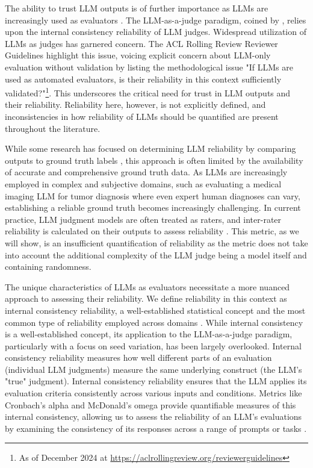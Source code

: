\documentclass[11pt]{article}
\begin{document}
The ability to trust LLM outputs is of further importance as LLMs are increasingly used as evaluators \citep{desmond2024evalullm, chan2023chateval}. The LLM-as-a-judge paradigm, coined by \citet{zheng2023judging}, relies upon the internal consistency reliability of LLM judges. Widespread utilization of LLMs as judges has garnered concern. The ACL Rolling Review Reviewer Guidelines highlight this issue, voicing explicit concern about LLM-only evaluation without validation by listing the methodological issue "If LLMs are used as automated evaluators, is their reliability in this context sufficiently validated?"\footnote{As of December 2024 at \url{https://aclrollingreview.org/reviewerguidelines}}. This underscores the critical need for trust in LLM outputs and their reliability. Reliability here, however, is not explicitly defined, and inconsistencies in how reliability of LLMs should be quantified are present throughout the literature.

While some research has focused on determining LLM reliability by comparing outputs to ground truth labels \citep{zhou2024llm, fu2023large}, this approach is often limited by the availability of accurate and comprehensive ground truth data. As LLMs are increasingly employed in complex and subjective domains, such as evaluating a medical imaging LLM for tumor diagnosis where even expert human diagnoses can vary, establishing a reliable ground truth becomes increasingly challenging. In current practice, LLM judgment models are often treated as raters, and inter-rater reliability is calculated on their outputs to assess reliability \citep{kollitsch2024does, wang2024prompt}. This metric, as we will show, is an insufficient quantification of reliability as the metric does not take into account the additional complexity of the LLM judge being a model itself and containing randomness. 


The unique characteristics of LLMs as evaluators necessitate a more nuanced approach to assessing their reliability. We define reliability in this context as internal consistency reliability, a well-established statistical concept and the most common type of reliability employed across domains \citet{henson2001understanding}. While internal consistency is a well-established concept, its application to the LLM-as-a-judge paradigm, particularly with a focus on seed variation, has been largely overlooked. Internal consistency reliability measures how well different parts of an evaluation (individual LLM judgments) measure the same underlying construct (the LLM's "true" judgment). Internal consistency reliability ensures that the LLM applies its evaluation criteria consistently across various inputs and conditions. Metrics like Cronbach's alpha and McDonald's omega  provide quantifiable measures of this internal consistency, allowing us to assess the reliability of an LLM's evaluations by examining the consistency of its responses across a range of prompts or tasks \citep{cronbach1951coefficient, mcdonald2013test, malkewitz2023estimating}. 
\end{document}
